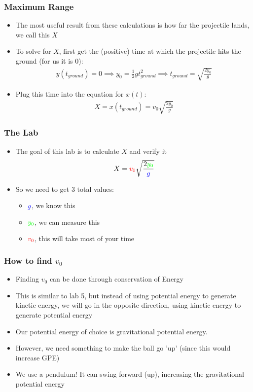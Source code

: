 \documentclass[aspectratio=169]{beamer}
\begin{document}
\begin{frame}
  \frametitle{Maximum Range}
  \begin{itemize}
  \item The most useful result from these calculations is how far the projectile lands, we call this $X$
  \item To solve for $X$, first get the (positive) time at which the projectile hits the ground (for us it is 0):
    \begin{align*}
      y(t_{ground})=0\implies y_0=\frac12gt_{ground}^2\implies
      t_{ground}=\sqrt{\frac{2y_0}g}
    \end{align*}
  \item Plug this time into the equation for $x(t)$:
    \begin{align*}
      X=x(t_{ground})=v_0\sqrt{\frac{2y_0}{g}}
    \end{align*}
  \end{itemize}
\end{frame}

\begin{frame}
  \frametitle{The Lab}
  \begin{itemize}
  \item The goal of this lab is to calculate $X$ and verify it
    \begin{align*}
      X={\color{red}v_0}\sqrt{\frac{2{\color{green}y_0}}{\color{blue}g}}
    \end{align*}
  \item So we need to get 3 total values:
    \begin{itemize}
    \item[\Large\smiley] $\color{blue}g$, we know this
    \item[\Large\smiley] $\color{green}y_0$, we can measure this
    \item[\Large\frownie] $\color{red}v_0$, this will take most of your time
    \end{itemize}
  \end{itemize}
\end{frame}

\begin{frame}
  \frametitle{How to find $v_0$}
  \begin{itemize}
  \item Finding $v_0$ can be done through conservation of Energy
  \item This is similar to lab 5, but instead of using potential energy to generate kinetic energy, we will go in the opposite direction, using kinetic energy to generate potential energy
  \item Our potential energy of choice is gravitational potential energy.
  \item However, we need something to make the ball go 'up' (since this would increase GPE)
  \item We use a pendulum! It can swing forward (up), increasing the gravitational potential energy
  \end{itemize}
\end{frame}
\end{document}
